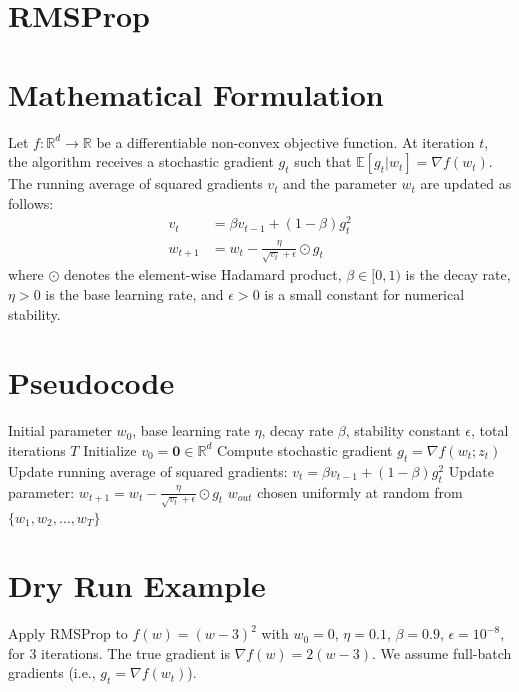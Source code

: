 \documentclass{article}
\begin{document}
\section*{RMSProp}
\section*{Mathematical Formulation}
Let $f: \mathbb{R}^d \to \mathbb{R}$ be a differentiable non-convex objective function. At iteration $t$, the algorithm receives a stochastic gradient $g_t$ such that $\mathbb{E}[g_t | w_t] = \nabla f(w_t)$. The running average of squared gradients $v_t$ and the parameter $w_t$ are updated as follows:
\begin{align}
v_t &= \beta v_{t-1} + (1-\beta) g_t^2 \\
w_{t+1} &= w_t - \frac{\eta}{\sqrt{v_t} + \epsilon} \odot g_t
\end{align}
where $\odot$ denotes the element-wise Hadamard product, $\beta \in [0, 1)$ is the decay rate, $\eta > 0$ is the base learning rate, and $\epsilon > 0$ is a small constant for numerical stability.

\section*{Pseudocode}
\begin{algorithm}[H]
\caption{RMSProp}
\begin{algorithmic}[1]
\REQUIRE Initial parameter $w_0$, base learning rate $\eta$, decay rate $\beta$, stability constant $\epsilon$, total iterations $T$
\STATE Initialize $v_0 = \mathbf{0} \in \mathbb{R}^d$
\STATE Compute stochastic gradient $g_t = \nabla f(w_t; z_t)$
\STATE Update running average of squared gradients: $v_t = \beta v_{t-1} + (1-\beta) g_t^2$
\STATE Update parameter: $w_{t+1} = w_t - \frac{\eta}{\sqrt{v_t} + \epsilon} \odot g_t$
\ENDFOR
\OUTPUT $w_{out}$ chosen uniformly at random from $\{w_1, w_2, \dots, w_T\}$
\end{algorithmic}
\end{algorithm}

\section*{Dry Run Example}
Apply RMSProp to $f(w) = (w-3)^2$ with $w_0 = 0$, $\eta = 0.1$, $\beta = 0.9$, $\epsilon = 10^{-8}$, for 3 iterations. The true gradient is $\nabla f(w) = 2(w-3)$. We assume full-batch gradients (i.e., $g_t = \nabla f(w_t)$).
\end{document}
